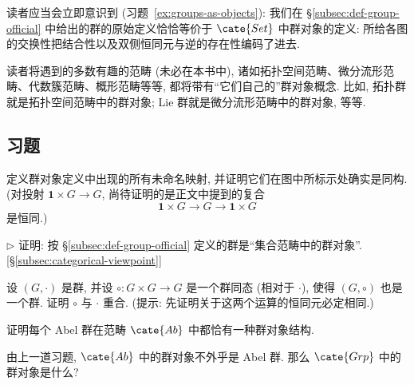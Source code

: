 读者应当会立即意识到 (习题~\ref{ex:groups-as-objects}): 我们在 \S\ref{subsec:def-group-official} 中给出的群的原始定义恰恰等价于 $\cate{Set}$ 中群对象的定义: 所给各图的交换性把结合性以及双侧恒同元与逆的存在性编码了进去.

读者将遇到的多数有趣的范畴 (未必在本书中), 诸如拓扑空间范畴、微分流形范畴、代数簇范畴、概形范畴等等, 都将带有``它们自己的''群对象概念. 比如, 拓扑群就是拓扑空间范畴中的群对象; Lie 群就是微分流形范畴中的群对象, 等等.

\subsection*{习题}
{}

\begin{prob}
\label{ex:unnamed-maps}
定义群对象定义中出现的所有未命名映射, 并证明它们在图中所标示处确实是同构. (对投射 $\mathbf{1} \times G \rightarrow G$, 尚待证明的是正文中提到的复合
\[
\mathbf{1} \times G \rightarrow G \rightarrow \mathbf{1} \times G
\]
是恒同.)
\end{prob}

\begin{prob}
\label{ex:groups-as-objects}
$\triangleright$ 证明: 按 \S\ref{subsec:def-group-official} 定义的群是``集合范畴中的群对象''. [\S\ref{subsec:categorical-viewpoint}]
\end{prob}

\begin{prob}
\label{ex:two-operations}
设 $(G, \cdot)$ 是群, 并设 $\circ : G \times G \to G$ 是一个群同态 (相对于 $\cdot$), 使得 $(G, \circ)$ 也是一个群. 证明 $\circ$ 与 $\cdot$ 重合. (提示: 先证明关于这两个运算的恒同元必定相同.)
\end{prob}

\begin{prob}
\label{ex:abelian-group-object}
证明每个 Abel 群在范畴 $\cate{Ab}$ 中都恰有一种群对象结构.
\end{prob}

\begin{prob}
\label{ex:group-object-grp}
由上一道习题, $\cate{Ab}$ 中的群对象不外乎是 Abel 群. 那么 $\cate{Grp}$ 中的群对象是什么?
\end{prob}
